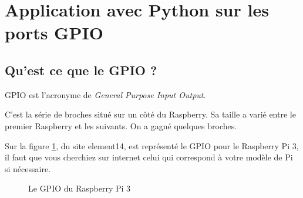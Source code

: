 \section{Application avec Python sur les ports GPIO}

\subsection{Qu'est ce que le GPIO ?}

GPIO est l'acronyme de \emph{General Purpose Input Output}.

C'est la série de broches situé sur un côté du Raspberry. Sa taille a varié entre le premier Raspberry et les suivants. On a gagné quelques broches.

Sur la figure \ref{img_gpio}, du site element14, est représenté le GPIO pour le Raspberry Pi 3, il faut que vous cherchiez sur internet celui qui correspond à votre modèle de Pi si nécessaire.

\begin{center}
\begin{figure}
	\caption{Le GPIO du Raspberry Pi 3}
	\label{img_gpio}
\end{figure}
\end{center}

